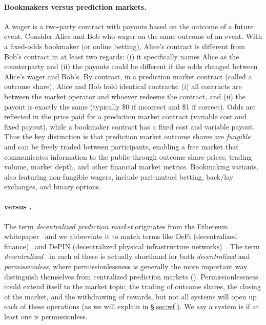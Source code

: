\paragraph{Bookmakers versus prediction markets.}

A wager is a two-party contract with payouts based on the outcome of a future event. Consider Alice and Bob who wager on the same outcome of an event. With a fixed-odds bookmaker (or online betting), Alice's contract is different from Bob's contract in at least two regards: (i) it specifically names Alice as the counterparty and (ii) the payouts could be different if the odds changed between Alice's wager and Bob's. By contrast, in a prediction market contract (called a outcome share), Alice and Bob hold identical contracts: (i) all contracts are between the market operator and whoever redeems the contract, and (ii) the payout is exactly the same (typically \$0 if incorrect and \$1 if correct). Odds are reflected in the price paid for a prediction market contract (\ie variable cost and fixed payout), while a bookmaker contract has a fixed cost and variable payout. Thus the key distinction is that prediction market outcome shares are \textit{fungible} and can be freely traded between participants, enabling a free market that communicates information to the public through outcome share prices, trading volume, market depth, and other financial market metrics. Bookmaking variants, also featuring non-fungible wagers, include pari-mutuel betting, back/lay exchanges, and binary options.

\paragraph{\cepm versus \depm.}

The term \textit{decentralized prediction market} originates from the Ethereum whitepaper~\cite{But13} and we abbreviate it \depm to match terms like DeFi (decentralized finance)~\cite{WPG+22} and DePIN (decentralized physical infrastructure networks)~\cite{LWS+24}. The term \textit{decentralized}~\cite{OKK24} in each of these is actually shorthand for both \textit{decentralized} and \textit{permissionless}, where permissionlessness is generally the more important way \depms distinguish themselves from centralized prediction markets (\cepms). Permissionlessness could extend itself to the market topic, the trading of outcome shares, the closing of the market, and the withdrawing of rewards, but not all systems will open up each of these operations (as we will explain in \S\ref{sec:wf}). We say a system is \depm if at least one is permissionless.

